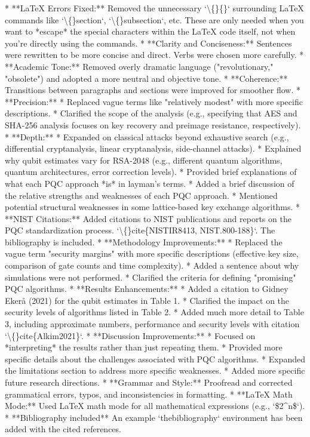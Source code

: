 \documentclass{article}
\begin{document}
*   **LaTeX Errors Fixed:** Removed the unnecessary `\textbackslash\{\}\{\}` surrounding LaTeX commands like `\textbackslash\{\}section`, `\textbackslash\{\}subsection`, etc.  These are only needed when you want to *escape* the special characters within the LaTeX code itself, not when you're directly using the commands.
*   **Clarity and Conciseness:** Sentences were rewritten to be more concise and direct. Verbs were chosen more carefully.
*   **Academic Tone:** Removed overly dramatic language ("revolutionary," "obsolete") and adopted a more neutral and objective tone.
*   **Coherence:**  Transitions between paragraphs and sections were improved for smoother flow.
*   **Precision:**
    *   Replaced vague terms like "relatively modest" with more specific descriptions.
    *   Clarified the scope of the analysis (e.g., specifying that AES and SHA-256 analysis focuses on key recovery and preimage resistance, respectively).
*   **Depth:**
    *   Expanded on classical attacks beyond exhaustive search (e.g., differential cryptanalysis, linear cryptanalysis, side-channel attacks).
    *   Explained why qubit estimates vary for RSA-2048 (e.g., different quantum algorithms, quantum architectures, error correction levels).
    *   Provided brief explanations of what each PQC approach *is* in layman's terms.
    *   Added a brief discussion of the relative strengths and weaknesses of each PQC approach.
    *   Mentioned potential structural weaknesses in some lattice-based key exchange algorithms.
*   **NIST Citations:** Added citations to NIST publications and reports on the PQC standardization process. `\textbackslash\{\}cite\{NISTIR8413, NIST.800-188\}`.  The bibliography is included.
*   **Methodology Improvements:**
    *   Replaced the vague term "security margins" with more specific descriptions (effective key size, comparison of gate counts and time complexity).
    *   Added a sentence about why simulations were not performed.
    *   Clarified the criteria for defining "promising" PQC algorithms.
*   **Results Enhancements:**
    *   Added a citation to Gidney Ekerå (2021) for the qubit estimates in Table 1.
    *   Clarified the impact on the security levels of algorithms listed in Table 2.
    *   Added much more detail to Table 3, including approximate numbers, performance and security levels with citation `\textbackslash\{\}cite\{Alkim2021\}`.
*   **Discussion Improvements:**
    *   Focused on *interpreting* the results rather than just repeating them.
    *   Provided more specific details about the challenges associated with PQC algorithms.
    *   Expanded the limitations section to address more specific weaknesses.
    *   Added more specific future research directions.
*   **Grammar and Style:** Proofread and corrected grammatical errors, typos, and inconsistencies in formatting.
*   **LaTeX Math Mode:** Used LaTeX math mode for all mathematical expressions (e.g., `\$2\textasciicircum{}n\$`).
*   **Bibliography included** An example `thebibliography` environment has been added with the cited references.
\end{document}
